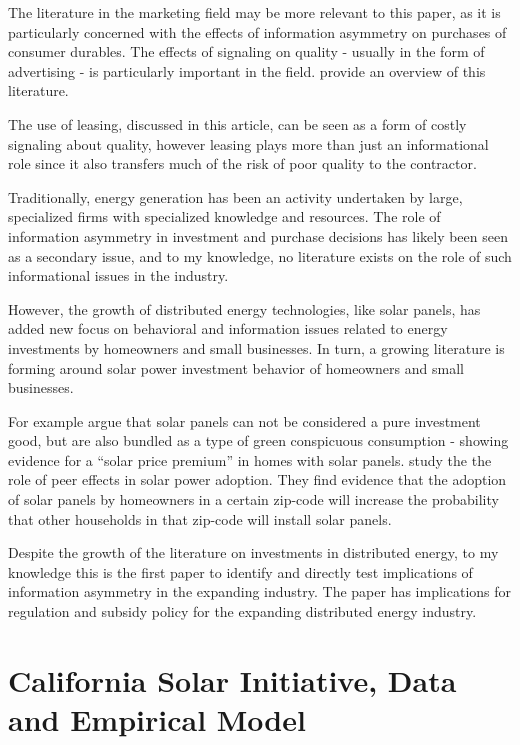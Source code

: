 \documentclass[12pt]{article}
\begin{document}
The literature in the marketing field may be more relevant to this paper, as it is particularly concerned with the effects of information asymmetry on purchases of consumer durables. The effects of signaling on quality - usually in the form of advertising - is particularly important in the field. \citet{kirmani_no_2000} provide an overview of this literature.

The use of leasing, discussed in this article, can be seen as a form of costly signaling about quality, however leasing plays more than just an informational role since it also transfers much of the risk of poor quality to the contractor.

Traditionally, energy generation has been an activity undertaken by large, specialized firms with specialized knowledge and resources. The role of information asymmetry in investment and purchase decisions has likely been seen as a secondary issue, and to my knowledge, no literature exists on the role of such informational issues in the industry.

However, the growth of distributed energy technologies, like solar panels, has added new focus on behavioral and information issues related to energy investments by homeowners and small businesses. In turn, a growing literature is forming around solar power investment behavior of homeowners and small businesses.

For example \citet{dastrup_understanding_2012} argue that solar panels can not be considered a pure investment good, but are also bundled as a type of green conspicuous consumption - showing evidence for a ``solar price premium'' in homes with solar panels. \citet{bollinger_peer_2012} study the the role of peer effects in solar power adoption. They find evidence that the adoption of solar panels by homeowners in a certain zip-code will increase the probability that other households in that zip-code will install solar panels.

Despite the growth of the literature on investments in distributed energy, to my knowledge this is the first paper to identify and directly test implications of information asymmetry in the expanding industry. The paper has implications for regulation and subsidy policy for the expanding distributed energy industry.

\section{California Solar Initiative, Data and Empirical Model}
\end{document}
